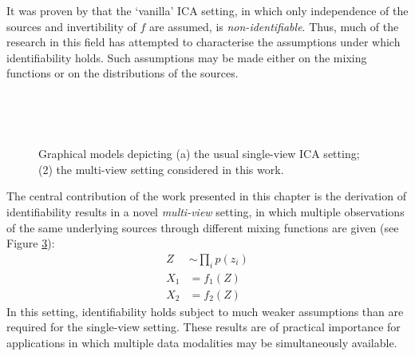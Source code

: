 It was proven by \cite{hyvarinen1999nonlinear} that the `vanilla' ICA setting, in which only independence of the sources and invertibility of $f$ are assumed, is \emph{non-identifiable}.
Thus, much of the research in this field has attempted to characterise the assumptions under which identifiability holds.
Such assumptions may be made either on the mixing functions or on the distributions of the sources. 


\begin{figure}
\center

\end{figure}

\begin{figure}
	\begin{subfigure}{.45\linewidth}
		\center\
		\caption{}\label{fig:ica-model:a}
	\end{subfigure}
	\hfill
	\begin{subfigure}{.45\linewidth}
		\center\
		\caption{}\label{fig:ica-model:b}
	\end{subfigure}
	\caption{Graphical models depicting (a) the usual single-view ICA setting; (2) the multi-view setting considered in this work.}
\end{figure}


The central contribution of the work presented in this chapter is the derivation of identifiability results in a novel \emph{multi-view} setting, in which multiple observations of the same underlying sources through different mixing functions are given (see Figure \ref{fig:ica-model:b}):
%
\begin{align*}
Z &\sim \prod_i p(z_i) \\
X_1 &= f_1(Z) \\
X_2 &= f_2(Z)
\end{align*}
%
In this setting, identifiability holds subject to much weaker assumptions than are required for the single-view setting.
These results are of practical importance for applications in which multiple data modalities may be simultaneously available.

